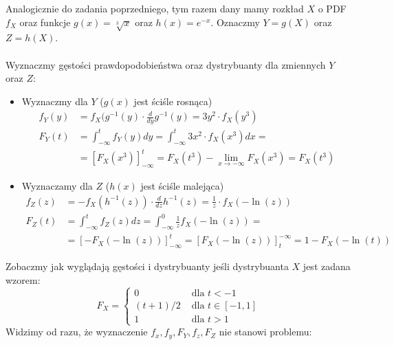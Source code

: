 \documentclass{article}
\begin{document}
Analogicznie do zadania poprzedniego, tym razem dany mamy rozkład $X$ o PDF $f_X$ oraz funkcje $g(x)=\sqrt[3]{x}$ oraz $h(x)=e^{-x}$. Oznaczmy $Y=g(X)$ oraz $Z=h(X)$.\\\\
\noindent
Wyznaczmy gęstości prawdopodobieństwa oraz dystrybuanty dla zmiennych $Y$ oraz $Z$:
\begin{itemize}
    \item Wyznaczmy dla $Y$ ($g(x)$ jest ściśle rosnąca)
    \setcounter{equation}{0}
    \begin{align}
     f_Y(y)&=f_X(g^{-1}(y)\cdot \frac{d}{dy} g^{-1}(y) = 3y^2\cdot f_X(y^3)\\
     F_Y(t)&=\int_{-\infty}^{t} f_Y(y) dy =\int_{-\infty}^{t} 3x^2 \cdot f_X(x^3) dx =\\
     &= \left[F_X(x^3)\right]_{-\infty}^{t} = F_X(t^3)-\lim_{x\rightarrow -\infty} F_X(x^3) = F_X(t^3)
    \end{align}
    \item Wyznaczamy dla $Z$ ($h(x)$ jest ściśle malejąca)
    \begin{align}
        f_Z(z)&=-f_X(h^{-1}(z))\cdot \frac{d}{dz} h^{-1}(z) = \frac{1}{z}\cdot f_X(-\ln(z))\\
        F_Z(t)&=\int_{-\infty}^{t} f_Z(z)dz = \int_{-\infty}^{0} \frac{1}{z}f_X(-\ln(z)) =\\ 
        &=\left[-F_X(-\ln(z))\right]_{-\infty}^{t}=
        \left[F_X(-\ln(z))\right]_{t}^{-\infty} = 1-F_X(-\ln(t))
    \end{align}
\end{itemize}
Zobaczmy jak wyglądają gęstości i dystrybuanty jeśli dystrybuanta $X$ jest zadana wzorem:
\[
F_X = \begin{cases}
    0 &\text{ dla } t < -1\\
    (t+1)/2 &\text{ dla } t \in[-1,1]\\
    1 &\text{ dla } t > 1
\end{cases}
\]
Widzimy od razu, że wyznaczenie $f_x, f_y, F_Y, f_z, F_Z$ nie stanowi problemu:
\end{document}
